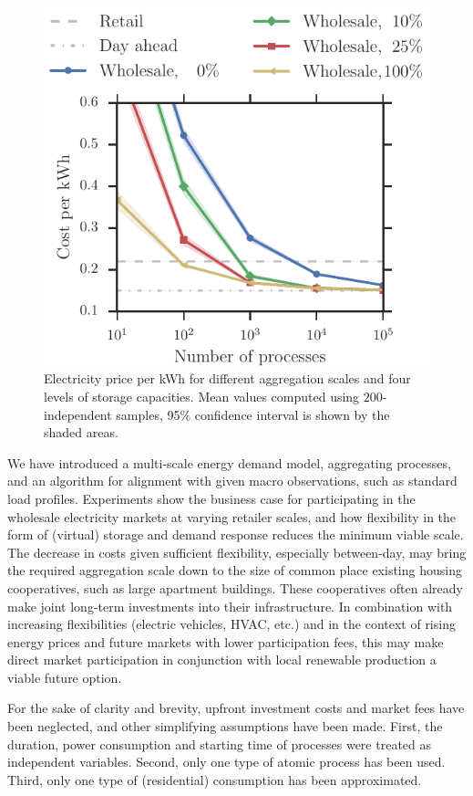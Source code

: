 \documentclass[conference]{IEEEtran}
\begin{document}
\begin{figure}[!t]
\centering
\includegraphics[width=0.9\columnwidth]{figures/Wholesale_betweenDay.pdf}
\caption{Electricity price per kWh for different aggregation scales and four levels of storage capacities. Mean values computed using $200$-independent samples, 95$\%$ confidence interval is shown by the shaded areas.}
\label{fig:Wholesale_betweenDay}
\end{figure}

We have introduced a multi-scale energy demand model, aggregating processes, and an algorithm for alignment with given macro observations, such as standard load profiles. Experiments show the business case for participating in the wholesale electricity markets at varying retailer scales, and how flexibility in the form of (virtual) storage and demand response reduces the minimum viable scale. The decrease in costs given sufficient flexibility, especially between-day, may bring the required aggregation scale down to the size of common place existing housing cooperatives, such as large apartment buildings. These cooperatives often already make joint long-term investments into their infrastructure. In combination with increasing flexibilities (electric vehicles, HVAC, etc.) and in the context of rising energy prices and future markets with lower participation fees, this may make direct market participation in conjunction with local renewable production a viable future option.

For the sake of clarity and brevity, upfront investment costs and market fees have been neglected, and other simplifying assumptions have been made. First, the duration, power consumption and starting time of processes were treated as independent variables. Second, only one type of atomic process has been used. Third, only one type of (residential) consumption has been approximated. 
\end{document}
